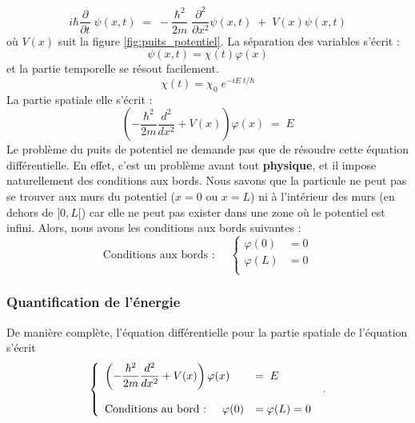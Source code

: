 \documentclass{book}
\begin{document}
\begin{equation}\label{eq:schrodinger_1D}
i \hbar \dfrac{\partial }{\partial t} \; \psi(x, t) \; = \; -\dfrac{\hbar ^2}{2m} \; \dfrac{ \partial ^2}{\partial x^2} \psi(x, t) \; + \; V(x) \psi(x,t)
\end{equation}
où $V(x)$ suit la figure \ref{fig:puits_potentiel}.
La séparation des variables s'écrit :
$$\psi(x,t) = \chi(t) \varphi(x)$$ et la partie temporelle se résout facilement.
$$\chi(t) = \chi_0 \; e^{-iE\; t/\hbar}$$
La partie spatiale elle s'écrit :
$$
\left(-\dfrac{\hbar ^2}{2m} \dfrac{ d ^2}{d x^2 }  + V(x)\right) \varphi(x) \; = \; E  $$
Le problème du puits de potentiel ne demande pas que de résoudre cette équation différentielle. En effet, c'est un problème avant tout \textbf{physique}, et il impose naturellement des conditions aux bords. Nous savons que la particule ne peut pas se trouver aux murs du potentiel ($x=0$ ou $x=L$) ni à l'intérieur des murs (en dehors de $]0,L[$) car elle ne peut pas exister dans une zone où le potentiel est infini. Alors, nous avons les conditions aux bords suivantes :
$$\text{Conditions aux bords : }\quad 
\left\{
  \begin{array}{ll}
    \varphi(0) &= 0 \\
    \varphi(L) &= 0 \\
  \end{array}
\right.
$$

\subsubsection{Quantification de l'énergie}
De manière complète, l'équation différentielle pour la partie spatiale de l'équation s'écrit 
$$\left \{ \begin{array}{ll}
  \left(-\dfrac{\hbar ^2}{2m} \dfrac{ d ^2}{d x^2 }  + V(x)\right) \varphi(x) \; &= \; E \\ \strut \\
  \text{Conditions au bord : } \quad \varphi(0) &= \varphi(L) = 0
  \end{array} \right. \; . $$
\end{document}
